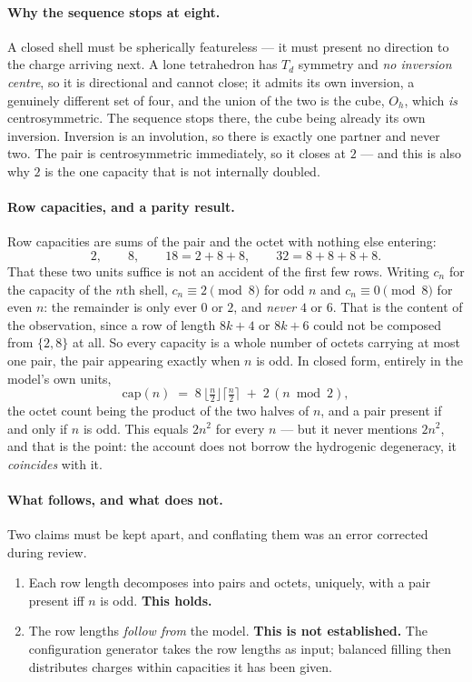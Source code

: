 \paragraph{Why the sequence stops at eight.}
A closed shell must be spherically featureless --- it must present no direction to the charge
arriving next. A lone tetrahedron has $T_d$ symmetry and \emph{no inversion centre}, so it is
directional and cannot close; it admits its own inversion, a genuinely different set of four, and
the union of the two is the cube, $O_h$, which \emph{is} centrosymmetric. The sequence stops
there, the cube being already its own inversion. Inversion is an involution, so there is exactly
one partner and never two. The pair is centrosymmetric immediately, so it closes at $2$ --- and
this is also why $2$ is the one capacity that is not internally doubled.

\paragraph{Row capacities, and a parity result.}
Row capacities are sums of the pair and the octet with nothing else entering:
\[
2,\qquad 8,\qquad 18 = 2{+}8{+}8,\qquad 32 = 8{+}8{+}8{+}8 .
\]
That these two units suffice is not an accident of the first few rows. Writing $c_n$ for the
capacity of the $n$th shell, $c_n \equiv 2 \pmod 8$ for odd $n$ and $c_n \equiv 0 \pmod 8$ for even
$n$: the remainder is only ever $0$ or $2$, and \emph{never} $4$ or $6$. That is the content of the
observation, since a row of length $8k{+}4$ or $8k{+}6$ could not be composed from
$\{2,8\}$ at all. So every capacity is a whole number of octets carrying at most one pair, the
pair appearing exactly when $n$ is odd. In closed form, entirely in the model's own units,
\[
\mathrm{cap}(n) \;=\; 8\,\Big\lfloor \tfrac n2 \Big\rfloor \Big\lceil \tfrac n2 \Big\rceil
\;+\; 2\,(n \bmod 2),
\]
the octet count being the product of the two halves of $n$, and a pair present if and only if $n$
is odd. This equals $2n^2$ for every $n$ --- but it never mentions $2n^2$, and that is the point:
the account does not borrow the hydrogenic degeneracy, it \emph{coincides} with it.

\paragraph{What follows, and what does not.}
Two claims must be kept apart, and conflating them was an error corrected during review.
\begin{enumerate}
\item[(A)] Each row length decomposes into pairs and octets, uniquely, with a pair present iff $n$
is odd. \textbf{This holds.}
\item[(B)] The row lengths \emph{follow from} the model. \textbf{This is not established.} The
configuration generator takes the row lengths as input; balanced filling then distributes charges
within capacities it has been given.
\end{enumerate}

